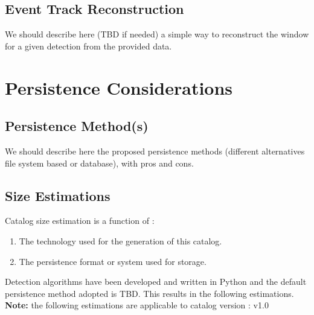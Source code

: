 \documentclass[a4paper, 11pt]{article}
\newcommand{\dmVersion}{v1.0}
\begin{document}

\subsection{Event Track Reconstruction}

We should describe here (TBD if needed) a simple way to reconstruct the window for a given detection from the provided data.

\section{Persistence Considerations}
\label{sec:persist}
\subsection{Persistence Method(s)}

We should describe here the proposed persistence methods (different alternatives file system based or database), with pros and cons.

\subsection{Size Estimations}

Catalog size estimation is a function of :
\begin{enumerate}
\item The technology used for the generation of this catalog. 
\item The persistence format or system used for storage.
\end{enumerate}

Detection algorithms have been developed and written in Python and the default persistence method adopted is TBD. This results in the following estimations.
\newline
\newline
\textbf{Note:} the following estimations are applicable to catalog version : \dmVersion  
\newline
\newline
\end{document}
